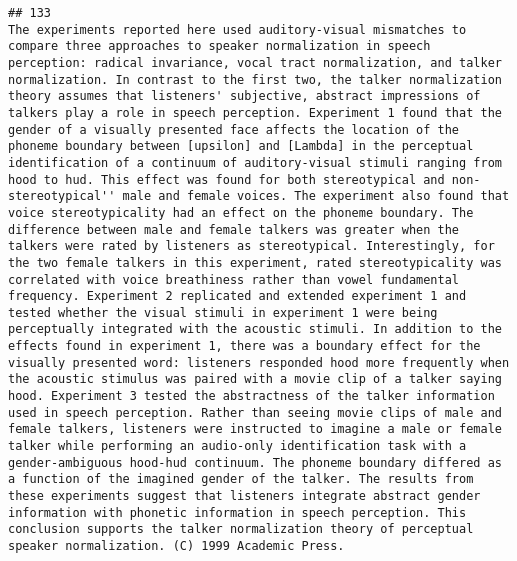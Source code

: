 \documentclass[
  english,
  man]{apa6}
\begin{document}
\begin{verbatim}
## 133                                                                                                                                                                                                                                                                                                                                                                                                                                                      The experiments reported here used auditory-visual mismatches to compare three approaches to speaker normalization in speech perception: radical invariance, vocal tract normalization, and talker normalization. In contrast to the first two, the talker normalization theory assumes that listeners' subjective, abstract impressions of talkers play a role in speech perception. Experiment 1 found that the gender of a visually presented face affects the location of the phoneme boundary between [upsilon] and [Lambda] in the perceptual identification of a continuum of auditory-visual stimuli ranging from hood to hud. This effect was found for both stereotypical and non-stereotypical'' male and female voices. The experiment also found that voice stereotypicality had an effect on the phoneme boundary. The difference between male and female talkers was greater when the talkers were rated by listeners as stereotypical. Interestingly, for the two female talkers in this experiment, rated stereotypicality was correlated with voice breathiness rather than vowel fundamental frequency. Experiment 2 replicated and extended experiment 1 and tested whether the visual stimuli in experiment 1 were being perceptually integrated with the acoustic stimuli. In addition to the effects found in experiment 1, there was a boundary effect for the visually presented word: listeners responded hood more frequently when the acoustic stimulus was paired with a movie clip of a talker saying hood. Experiment 3 tested the abstractness of the talker information used in speech perception. Rather than seeing movie clips of male and female talkers, listeners were instructed to imagine a male or female talker while performing an audio-only identification task with a gender-ambiguous hood-hud continuum. The phoneme boundary differed as a function of the imagined gender of the talker. The results from these experiments suggest that listeners integrate abstract gender information with phonetic information in speech perception. This conclusion supports the talker normalization theory of perceptual speaker normalization. (C) 1999 Academic Press.

\end{verbatim}
\end{document}
